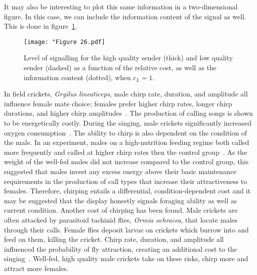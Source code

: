 \documentclass[a4paper,12pt]{article}
\numberwithin{equation}{section}
\begin{document}
\newpage

It may also be interesting to plot this same information in a two-dimensional figure. In this case, we can include the information content of the signal as well. This is done in figure~\ref{fig:Figure 26.pdf}.
\begin{figure}[!h]
\captionsetup{width=300pt}
\begin{center}
\leavevmode
\texttt{[image: "Figure 26.pdf]}
\caption{Level of signalling for the high quality sender (thick) and low quality sender (dashed) as a function of the relative cost, as well as the information content (dotted), when $c_{L}=1$.}
\label{fig:Figure 26.pdf}
\end{center}
\end{figure}

In field crickets, \textit{Gryilus lineaticeps}, male chirp rate, duration, and amplitude all influence female mate choice; females prefer higher chirp rates, longer chirp durations, and higher chirp amplitudes~\cite{Wagner1996}. The production of calling songs is shown to be energetically costly. During the singing, male crickets significantly increased oxygen consumption~\cite{Hoback1997}. The ability to chirp is also dependent on the condition of the male. In an experiment, males on a high-nutrition feeding regime both called more frequently and called at higher chirp rates then the control group~\cite{Wagner1999}. As the weight of the well-fed males did not increase compared to the control group, this suggested that males invest any excess energy above their basic maintenance requirements in the production of call types that increase their attractiveness to females. Therefore, chirping entails a differential, condition-dependent cost and it may be suggested that the display honestly signals foraging ability as well as current condition. Another cost of chirping has been found. Male crickets are often attacked by parasitoid tachinid flies, \textit{Ormia ochracea}, that locate males through their calls. Female flies deposit larvae on crickets which burrow into and feed on them, killing the cricket. Chirp rate, duration, and amplitude all influenced the probability of fly attraction, creating an additional cost to the singing~\cite{Wagner1996}. Well-fed, high quality male crickets take on these risks, chirp more and attract more females.
\end{document}

